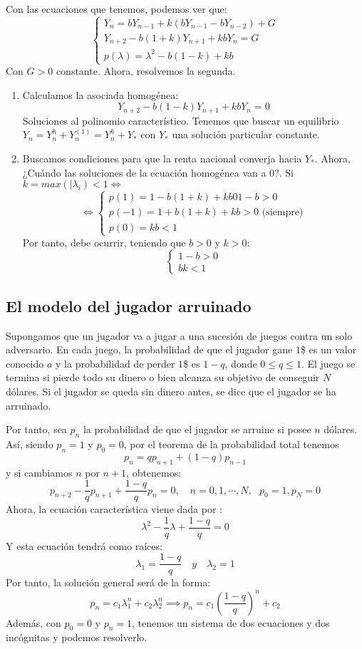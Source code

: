 \documentclass[11pt, a4paper]{article}
\newif\IfInSansMode
\numberwithin{equation}{section}
\theoremstyle{theorem-style}
\theoremstyle{definition-style}
\theoremstyle{remark-style}
\theoremstyle{example-style}
\begin{document}
Con las ecuaciones que tenemos, podemos ver que:
\[
\begin{cases}
	Y_n  = bY _{n-1} + k(b Y _{n-1} - b Y _{n-2}) + G\\
	Y _{n+2} - b(1+k)Y _{n+1} + kb Y_n = G\\
	p(\lambda) = \lambda^2 - b(1-k) +kb
\end{cases}
\]
Con $G > 0 $ constante. Ahora, resolvemos la segunda.
\begin{enumerate}
	\item Calculamos la asociada homogénea:
	 \[
	 Y _{n+2} - b(1-k)Y _{n+1} + kb Y_n = 0
	 \]
	 Soluciones al polinomio característico. Tenemos que buscar un equilibrio $Y_n = Y_n^h + Y_n^{(1)} = Y_n^h + Y_*$ con $Y_*$ una solución particular constante. 
	 \item Buscamos condiciones para que la renta nacional converja hacia $Y_*$. Ahora, ¿Cuándo las soluciones de la ecuación homogénea van a 0?. Si $k = max (|\lambda_i) < 1 \iff$
	 \[
	 \iff \begin{cases}
	p(1) = 1-b(1+k) +kb 0 1-b > 0\\
	p(-1) = 1+b(1+k) +kb > 0 \text{ (siempre)}\\
	p(0) = kb < 1
\end{cases}
	 \]
	 Por tanto, debe ocurrir, teniendo que $b> 0 $ y $k > 0$:
	 \[
	 \begin{cases}
	1-b > 0\\
	bk < 1
\end{cases}
	 \]
	 
\end{enumerate}

\subsection{El modelo del jugador arruinado}
Supongamos que un jugador va a jugar a una sucesión de juegos contra un solo adversario. En cada juego, la probabilidad de que el jugador gane $1$\$ es un valor conocido $a$ y la probabilidad de perder $1$\$ es $1-q$, donde $0\leq q \leq 1$. El juego se termina si pierde todo su dinero o bien alcanza su objetivo de conseguir $N$ dólares. Si el jugador se queda sin dinero antes, se dice que el jugador se ha arruinado.

Por tanto, sea $p_n$ la probabilidad de que el jugador se arruine si posee $n$ dólares. Así, siendo $p_n =1$ y $p_0 = 0$, por el teorema de la probabilidad total tenemos
\[
p_n = q p _{n+1} + (1-q) p _{n-1}
\]
y si cambiamos $n$ por $n+1$, obtenemos:
\[
p _{n+2} - \dfrac{1}{q}p _{n+1} + \dfrac{1-q}{q}p_n = 0, \quad n= 0,1,\cdots,N, \ \ \ p_0 = 1, p_N = 0
\]
Ahora, la ecuación característica viene dada por : 
\[
\lambda ^2 - \dfrac{1}{q}\lambda + \dfrac{1-q}{q} = 0
\]
Y esta ecuación tendrá como raíces:
\[
\lambda_1 = \dfrac{1-q}{q} \quad y \quad \lambda_2 = 1
\]
Por tanto, la solución general será de la forma:
\[
p_n = c_1 \lambda_1^n + c_2\lambda_2^n \implies p_n= c_1 (\dfrac{1-q}{q})^n + c_2
\]
Además, con $p_0 = 0$ y $p_n = 1$, tenemos un sistema de dos ecuaciones y dos
incógnitas y podemos resolverlo.
\end{document}

